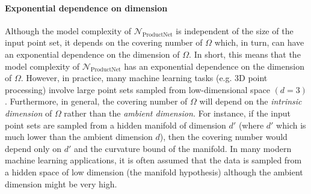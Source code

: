 \documentclass[12pt]{article}
\newcommand{\samedit}[1]{{{\textcolor{darkblue}{#1}}}}
\begin{document}
\paragraph{Exponential dependence on dimension}
Although the model complexity of $\mathcal{N}_{\mathrm{ProductNet}}$ is independent of the size of the input point set, it depends on the covering number of $\Omega$ which, in turn, can have an exponential dependence on the dimension of $\Omega$. 
In short, this means that the model complexity of $\mathcal{N}_{\mathrm{ProductNet}}$ has an exponential dependence on the dimension of $\Omega$. 
However, in practice, many machine learning tasks (e.g. 3D point processing) involve large point sets sampled from low-dimensional space $(d = 3)$. 
Furthermore, in general, the covering number of $\Omega$ will depend on the \textit{intrinsic dimension} of $\Omega$ rather than the \textit{ambient dimension. }
For instance, if the input point sets are sampled from a hidden manifold of dimension $d'$ (where $d'$ which is much lower than the ambient dimension $d$), then the covering number would depend only on $d'$ and the curvature bound of the manifold. 
In many modern machine learning applications, it is often assumed that the data is sampled from a hidden space of low dimension (the manifold hypothesis) although the ambient dimension might be very high. 
\end{document}
